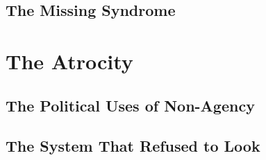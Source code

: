 \documentclass[12pt, openany, oneside]{book}
\begin{document}
\chapter{The Missing Syndrome}






\part{The Atrocity}

\chapter{The Political Uses of Non-Agency}



\chapter{The System That Refused to Look}



\end{document}
